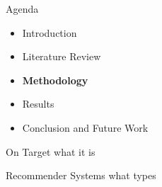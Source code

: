 \begin{frame}{Agenda}
\begin{itemize}
    \item Introduction
    \item Literature Review
    \item \textbf{Methodology}
    \item Results
    \item Conclusion and Future Work
\end{itemize}
\end{frame}

%

\begin{frame}{On Target}
    what it is
\end{frame}


\begin{frame}{Recommender Systems}
    what types
\end{frame}